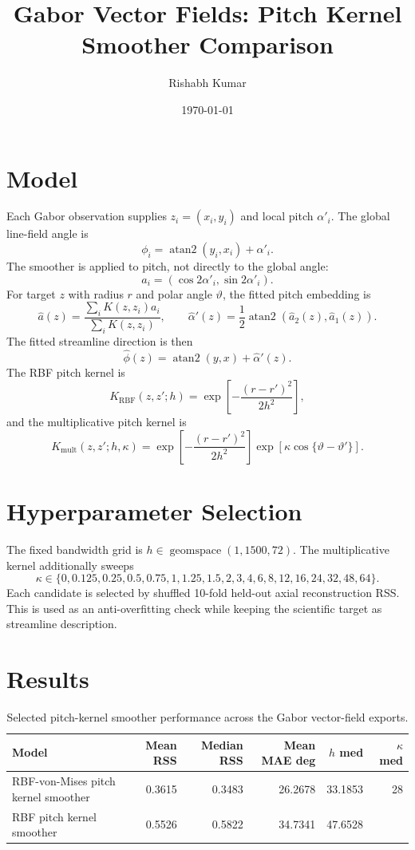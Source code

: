 \documentclass[10pt]{article}
\title{Gabor Vector Fields: Pitch Kernel Smoother Comparison}
\author{Rishabh Kumar}
\date{\today}
\begin{document}
\maketitle

\section{Model}
Each Gabor observation supplies $z_i=(x_i,y_i)$ and local pitch $\alpha'_i$. The global line-field angle is
\[
  \phi_i=\operatorname{atan2}(y_i,x_i)+\alpha'_i.
\]
The smoother is applied to pitch, not directly to the global angle:
\[
  a_i=(\cos 2\alpha'_i,\sin 2\alpha'_i).
\]
For target $z$ with radius $r$ and polar angle $\vartheta$, the fitted pitch embedding is
\[
  \hat a(z)=\frac{\sum_i K(z,z_i)a_i}{\sum_i K(z,z_i)},
  \qquad
  \hat\alpha'(z)=\frac12\operatorname{atan2}(\hat a_2(z),\hat a_1(z)).
\]
The fitted streamline direction is then
\[
  \hat\phi(z)=\operatorname{atan2}(y,x)+\hat\alpha'(z).
\]
The RBF pitch kernel is
\[
  K_{\mathrm{RBF}}(z,z';h)=
  \exp\left[-\frac{(r-r')^2}{2h^2}\right],
\]
and the multiplicative pitch kernel is
\[
  K_{\mathrm{mult}}(z,z';h,\kappa)=
  \exp\left[-\frac{(r-r')^2}{2h^2}\right]
  \exp\left[\kappa\cos\{\vartheta-\vartheta'\}\right].
\]

\section{Hyperparameter Selection}
The fixed bandwidth grid is $h\in\operatorname{geomspace}(1,1500,72)$. The multiplicative kernel additionally sweeps
\[
  \kappa\in
  \{0,0.125,0.25,0.5,0.75,1,1.25,1.5,2,3,4,6,8,12,16,24,32,48,64\}.
\]
Each candidate is selected by shuffled 10-fold held-out axial reconstruction RSS. This is used as an anti-overfitting check while keeping the scientific target as streamline description.

\section{Results}
\begin{table}[h!]
\centering
\small
\begin{tabular}{lrrrrr}
\toprule
Model & Mean RSS & Median RSS & Mean MAE deg & $h$ med & $\kappa$ med \\
\midrule
RBF-von-Mises pitch kernel smoother & 0.3615 & 0.3483 & 26.2678 & 33.1853 & 28 \\
RBF pitch kernel smoother & 0.5526 & 0.5822 & 34.7341 & 47.6528 &  \\
\bottomrule
\end{tabular}
\caption{Selected pitch-kernel smoother performance across the Gabor vector-field exports.}
\end{table}
\end{document}
